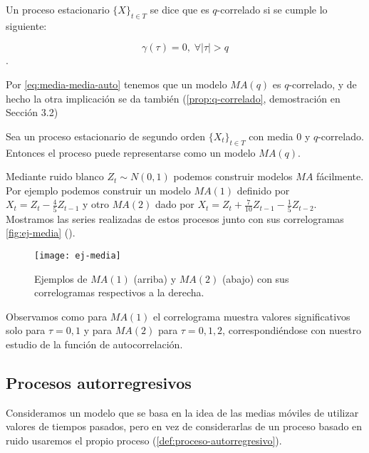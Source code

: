 \begin{definicion}
  Un proceso estacionario $\{X\}_{t \in T}$ se dice que es $q$-correlado si se cumple lo siguiente:

  $$\gamma(\tau) = 0, \; \forall |\tau| > q$$.
  \label{def:q-correlacion}
\end{definicion}

Por \eqref{eq:media-media-auto} tenemos que un modelo $MA(q)$ es $q$-correlado, y de hecho la otra implicación se da también (\autoref{prop:q-correlado}, demostración en \cite{brockwell1991time} Sección 3.2)

\begin{proposicion}
  Sea un proceso estacionario de segundo orden $\{X_t\}_{t \in T}$ con media 0 y $q$-correlado. Entonces el proceso puede representarse como un modelo $MA(q)$.
\label{prop:q-correlado}
\end{proposicion}

Mediante ruido blanco $Z_t \sim N(0, 1)$ podemos construir modelos $MA$ fácilmente. Por ejemplo podemos construir un modelo $MA(1)$ definido por $X_t = Z_t - \frac{4}{5}Z_{t - 1}$ y otro $MA(2)$ dado por $X_t = Z_t + \frac{7}{10} Z_{t - 1} - \frac{1}{5}Z_{t - 2}$. Mostramos las series realizadas de estos procesos junto con sus correlogramas \autoref{fig:ej-media} (\cite{chatfield2019analysis}).

\begin{figure}[htpb]
  \centering
  \texttt{[image: ej-media]}
  \caption{Ejemplos de $MA(1)$ (arriba) y $MA(2)$ (abajo) con sus correlogramas respectivos a la derecha.}
  \label{fig:ej-media}
\end{figure}

Observamos como para $MA(1)$ el correlograma muestra valores significativos solo para $\tau = 0, 1$ y para $MA(2)$ para $\tau = 0, 1, 2$, correspondiéndose con nuestro estudio de la función de autocorrelación.

\subsection{Procesos autorregresivos}

Consideramos un modelo que se basa en la idea de las medias móviles de utilizar valores de tiempos pasados, pero en vez de considerarlas de un proceso basado en ruido usaremos el propio proceso (\autoref{def:proceso-autorregresivo}).

